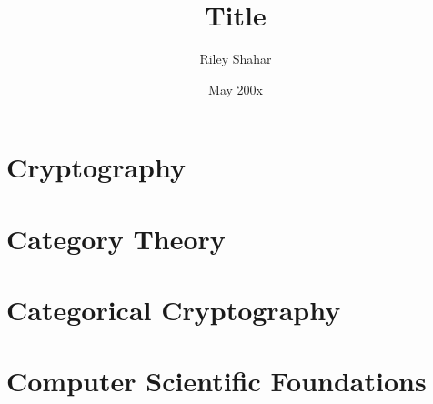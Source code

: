 \documentclass[12pt,twoside]{reedthesis}
\title{Title} %
\author{Riley Shahar}
\date{May 200x} %
\begin{document}
\maketitle
\frontmatter
\pagestyle{empty} %




\tableofcontents



\mainmatter%
\pagestyle{fancyplain} %


\chapter{Cryptography}


\chapter{Category Theory}


\chapter{Categorical Cryptography}
\label{chap:categorical-cryptography}


\appendix
\chapter{Computer Scientific Foundations}
\label{chap:cs-theory}


\backmatter{}
\nocite{*}
\printbibliography


\end{document}
